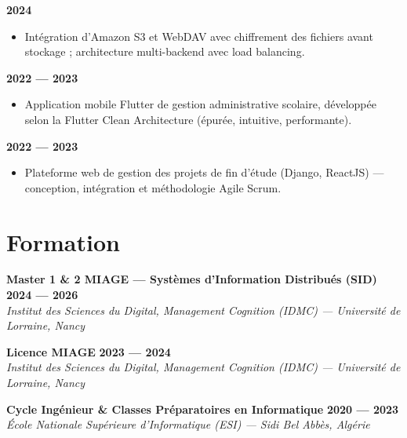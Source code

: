 \documentclass[10pt,a4paper]{article}
\begin{document}
\vspace{0.2cm}

 \hfill \textbf{2024}
\begin{itemize}[leftmargin=0.5cm, noitemsep, topsep=0pt, partopsep=0pt]
    \item Intégration d'Amazon S3 et WebDAV avec chiffrement des fichiers avant stockage ; architecture multi-backend avec load balancing.
\end{itemize}

\vspace{0.2cm}

 \hfill \textbf{2022 — 2023}
\begin{itemize}[leftmargin=0.5cm, noitemsep, topsep=0pt, partopsep=0pt]
    \item Application mobile Flutter de gestion administrative scolaire, développée selon la Flutter Clean Architecture (épurée, intuitive, performante).
\end{itemize}

\vspace{0.2cm}

 \hfill \textbf{2022 — 2023}
\begin{itemize}[leftmargin=0.5cm, noitemsep, topsep=0pt, partopsep=0pt]
    \item Plateforme web de gestion des projets de fin d'étude (Django, ReactJS) — conception, intégration et méthodologie Agile Scrum.
\end{itemize}

\section*{Formation}

\noindent \textbf{Master 1 \& 2 MIAGE — Systèmes d'Information Distribués (SID)} \hfill \textbf{2024 — 2026} \\
\textit{Institut des Sciences du Digital, Management Cognition (IDMC) — Université de Lorraine, Nancy}

\vspace{0.15cm}
\noindent \textbf{Licence MIAGE} \hfill \textbf{2023 — 2024} \\
\textit{Institut des Sciences du Digital, Management Cognition (IDMC) — Université de Lorraine, Nancy}

\vspace{0.15cm}
\noindent \textbf{Cycle Ingénieur \& Classes Préparatoires en Informatique} \hfill \textbf{2020 — 2023} \\
\textit{École Nationale Supérieure d'Informatique (ESI) — Sidi Bel Abbès, Algérie}
\end{document}
